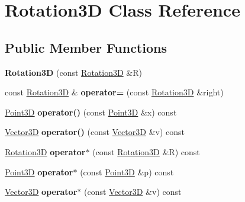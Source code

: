 \hypertarget{classRotation3D}{}\section{Rotation3D Class Reference}
\label{classRotation3D}
\subsection*{Public Member Functions}
\begin{DoxyCompactItemize}
\item 
\mbox{\label{classRotation3D_a92c13a00bfbcd09df47b852c7551751f}} 
{\bfseries Rotation3D} (const \hyperlink{classRotation3D}{Rotation3D} \&R)
\item 
\mbox{\label{classRotation3D_ab44a2952513af8c8a6d81276ab74cee7}} 
const \hyperlink{classRotation3D}{Rotation3D} \& {\bfseries operator=} (const \hyperlink{classRotation3D}{Rotation3D} \&right)
\item 
\mbox{\label{classRotation3D_ab013ab82e560f87799240c3f98e6c9fb}} 
\hyperlink{classTVec3D}{Point3D} {\bfseries operator()} (const \hyperlink{classTVec3D}{Point3D} \&x) const
\item 
\mbox{\label{classRotation3D_a8106c1eb8bd8aa5302730e4770ea0858}} 
\hyperlink{classTVec3D}{Vector3D} {\bfseries operator()} (const \hyperlink{classTVec3D}{Vector3D} \&v) const
\item 
\mbox{\label{classRotation3D_ad5b8b8aa6c03845519f8246bfe43a57f}} 
\hyperlink{classRotation3D}{Rotation3D} {\bfseries operator$\ast$} (const \hyperlink{classRotation3D}{Rotation3D} \&R) const
\item 
\mbox{\label{classRotation3D_af007ab8ce2f92651e92d65be9b19a151}} 
\hyperlink{classTVec3D}{Point3D} {\bfseries operator$\ast$} (const \hyperlink{classTVec3D}{Point3D} \&p) const
\item 
\mbox{\label{classRotation3D_a6eae3a36df1cc7795681df5885a07619}} 
\hyperlink{classTVec3D}{Vector3D} {\bfseries operator$\ast$} (const \hyperlink{classTVec3D}{Vector3D} \&v) const
\item 
\mbox{\label{classRotation3D_a9bd372db0fd5a03ef147bd78f5e1d5a4}} 

\end{DoxyCompactItemize}
